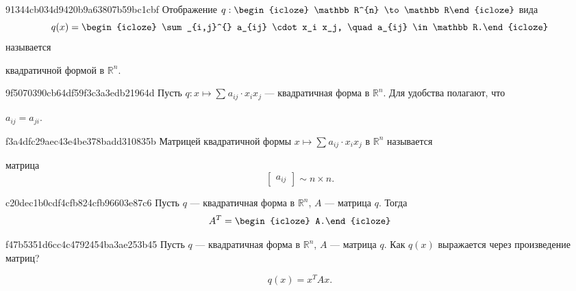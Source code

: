 \begin{note}{91344cb034d9420b9a63807b59bc1cbf}
    Отображение \({ q : \begin{icloze}{1}\mathbb R^{n} \to \mathbb R\end{icloze} }\) вида
    \[
        q(x) = \begin{icloze}{2}\sum_{i,j}^{} a_{ij} \cdot x_i x_j, \quad a_{ij} \in \mathbb R.\end{icloze}
    \]
    называется \begin{icloze}{3}квадратичной формой в \({ \mathbb R^{n} }\).\end{icloze}
\end{note}

\begin{note}{9f5070390cb64df59f3c3a3edb21964d}
    Пусть \({ q : x \mapsto  \sum_{}^{} a_{ij} \cdot x_i x_j }\) --- квадратичная форма в \({ \mathbb R^{n} }\).
    Для удобства полагают, что \begin{icloze}{1}\({ a_{ij} = a_{ji} }\).\end{icloze}
\end{note}

\begin{note}{f3a4dfc29aec43e4be378badd310835b}
    Матрицей квадратичной формы \({ x \mapsto  \sum_{}^{} a_{ij} \cdot x_i x_j }\) в \({ \mathbb R^{n} }\) называется
    \begin{icloze}{1}
        матрица
        \[
            \begin{bmatrix}
                a_{ij}
            \end{bmatrix}
            \sim n \times n.
        \]
    \end{icloze}
\end{note}

\begin{note}{c20dec1b0cdf4cfb824cfb96603e87c6}
    Пусть \({ q }\) --- квадратичная форма в \({ \mathbb R^{n} }\), \({ A }\) --- матрица \({ q }\).
    Тогда
    \[
        A^{T} = \begin{icloze}{1}A.\end{icloze}
    \]
\end{note}

\begin{note}{f47b5351d6cc4c4792454ba3ae253b45}
    Пусть \({ q }\) --- квадратичная форма в \({ \mathbb R^{n} }\), \({ A }\) --- матрица \({ q }\).
    Как \({ q(x) }\) выражается через произведение матриц?

    \begin{cloze}{1}
        \[
            q(x) = x^{T}Ax.
        \]
    \end{cloze}
\end{note}

